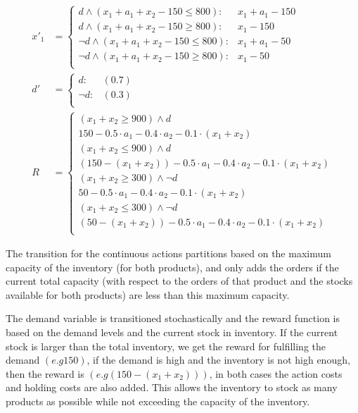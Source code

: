 \documentclass[letterpaper]{article}
\begin{document}
{\footnotesize
\begin{align*}
x'_1 & = \begin{cases}
d  \wedge (x_1 + a_1 + x_2 - 150 \leq 800) : & x_1 + a_1 - 150 \\
d  \wedge (x_1 + a_1 + x_2 - 150 \geq 800) : & x_1 - 150  \\
\neg d \wedge (x_1 + a_1 + x_2 - 150 \leq 800): & x_1 + a_1 - 50    \\
\neg d \wedge (x_1 + a_1 + x_2 - 150 \geq 800): & x_1 - 50    \\
\end{cases}\\
d' & =  \begin{cases}
d     : &(0.7)\\
\neg d: &(0.3)\\
\end{cases}\\
R & = \begin{cases}
(x_1 + x_2 \geq 900) \wedge d\\
150 - 0.5\cdot a_1 -0.4 \cdot a_2 - 0.1\cdot(x_1 + x_2) \\
(x_1 + x_2 \leq 900) \wedge d\\
(150 - (x_1+x_2)) - 0.5\cdot a_1 -0.4 \cdot a_2 - 0.1\cdot(x_1 + x_2) \\
(x_1 + x_2 \geq 300) \wedge \neg d\\
50 - 0.5\cdot a_1 -0.4 \cdot a_2 - 0.1\cdot(x_1 + x_2) \\
(x_1 + x_2 \leq 300) \wedge \neg d\\
(50 - (x_1+x_2)) - 0.5\cdot a_1 -0.4 \cdot a_2 - 0.1\cdot(x_1 + x_2) \\
\end{cases}
\end{align*}}

The transition for the continuous actions partitions based on the maximum capacity of the inventory (for both products), and only adds the orders if the current total capacity (with respect to the orders of that product and the stocks available for both products) are less than this maximum capacity. 

The demand variable is transitioned stochastically and the reward function is based on the demand levels and the current stock in inventory. If the current stock is larger than the total inventory, we get the reward for fulfilling the demand $(e.g 150)$, if the demand is high and the inventory is not high enough, then the reward is $(e.g (150 - (x_1+x_2)))$, in both cases the action costs and holding costs are also added. This allows the inventory to stock as many products as possible while not exceeding the capacity of the inventory. 
\end{document}
